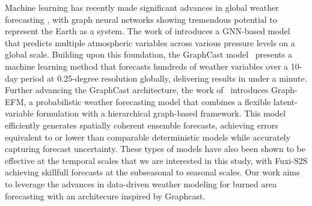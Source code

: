 Machine learning has recently made significant advances in global weather forecasting \cite{rasp2024weatherbench}, with graph neural networks showing tremendous potential to represent the Earth as a system\cite{keisler2022forecasting, lam2022graphcast}. The work of \cite{keisler2022forecasting} introduces a GNN-based model that predicts multiple atmospheric variables across various pressure levels on a global scale. 
Building upon this foundation, the GraphCast model~\cite{lam2022graphcast} presents a machine learning method that forecasts hundreds of weather variables over a 10-day period at 0.25-degree resolution globally, delivering results in under a minute.
Further advancing the GraphCast architecture, the work of~\cite{oskarsson2024probabilistic} introduces Graph-EFM, a probabilistic weather forecasting model that combines a flexible latent-variable formulation with a hierarchical graph-based framework. This model efficiently generates spatially coherent ensemble forecasts, achieving errors equivalent to or lower than comparable deterministic models while accurately capturing forecast uncertainty. These types of models  have also been shown to be effective at the temporal scales that we are interested in this study, with Fuxi-S2S \cite{chen2023fuxi} achieving skillfull forecasts at the subseasonal to seasonal scales. Our work aims to leverage the advances in data-driven weather modeling for burned area forecasting with an architecure inspired by Graphcast.